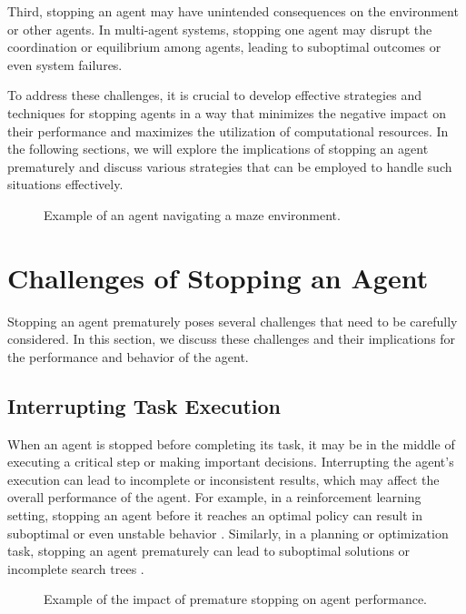 \documentclass{article}
\begin{document}
Third, stopping an agent may have unintended consequences on the environment or other agents. In multi-agent systems, stopping one agent may disrupt the coordination or equilibrium among agents, leading to suboptimal outcomes or even system failures.

To address these challenges, it is crucial to develop effective strategies and techniques for stopping agents in a way that minimizes the negative impact on their performance and maximizes the utilization of computational resources. In the following sections, we will explore the implications of stopping an agent prematurely and discuss various strategies that can be employed to handle such situations effectively.

\begin{figure}[h]
  \centering
  \caption{Example of an agent navigating a maze environment.}
  \label{fig:maze_agent}
\end{figure}
\section{Challenges of Stopping an Agent}

Stopping an agent prematurely poses several challenges that need to be carefully considered. In this section, we discuss these challenges and their implications for the performance and behavior of the agent.

\subsection{Interrupting Task Execution}

When an agent is stopped before completing its task, it may be in the middle of executing a critical step or making important decisions. Interrupting the agent's execution can lead to incomplete or inconsistent results, which may affect the overall performance of the agent. For example, in a reinforcement learning setting, stopping an agent before it reaches an optimal policy can result in suboptimal or even unstable behavior \cite{mnih2015human}. Similarly, in a planning or optimization task, stopping an agent prematurely can lead to suboptimal solutions or incomplete search trees \cite{russell2016artificial}.

\begin{figure}[h]
  \centering
  \caption{Example of the impact of premature stopping on agent performance.}
  \label{fig:premature_stopping}
\end{figure}
\end{document}
